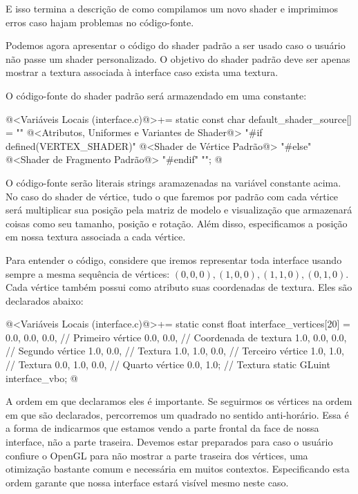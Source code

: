 E isso termina a descrição de como compilamos um novo shader e
imprimimos erros caso hajam problemas no código-fonte.

Podemos agora apresentar o código do shader padrão a ser usado caso o
usuário não passe um shader personalizado. O objetivo do shader padrão
deve ser apenas mostrar a textura associada à interface caso exista
uma textura.

O código-fonte do shader padrão será armazendado em uma constante:

\iniciocodigo
@<Variáveis Locais (interface.c)@>+=
static const char default_shader_source[] = ""
@<Atributos, Uniformes e Variantes de Shader@>
"#if defined(VERTEX_SHADER)\n"
@<Shader de Vértice Padrão@>
"#else\n"
@<Shader de Fragmento Padrão@>
"#endif\n"
                                           "";
@
\fimcodigo

O código-fonte serão literais strings aramazenadas na variável
constante acima. No caso do shader de vértice, tudo o que faremos por
padrão com cada vértice será multiplicar sua posição pela matriz de
modelo e visualização que armazenará coisas como seu tamanho, posição
e rotação. Além disso, especificamos a posição em nossa textura
associada a cada vértice.

Para entender o código, considere que iremos representar toda
interface usando sempre a mesma sequência de vértices: $(0, 0, 0), (1,
0, 0), (1, 1, 0), (0, 1, 0)$. Cada vértice também possui como atributo
suas coordenadas de textura. Eles são declarados abaixo:

\iniciocodigo
@<Variáveis Locais (interface.c)@>+=
static const float interface_vertices[20] = {
  0.0, 0.0, 0.0, // Primeiro vértice
  0.0, 0.0,     // Coordenada de textura
  1.0, 0.0, 0.0, // Segundo vértice
  1.0, 0.0,     // Textura
  1.0, 1.0, 0.0,  // Terceiro vértice
  1.0, 1.0,      // Textura
  0.0, 1.0, 0.0, // Quarto vértice
  0.0, 1.0};    // Textura
static GLuint interface_vbo;
@
\fimcodigo

A ordem em que declaramos eles é importante. Se seguirmos os vértices
na ordem em que são declarados, percorremos um quadrado no sentido
anti-horário. Essa é a forma de indicarmos que estamos vendo a parte
frontal da face de nossa interface, não a parte traseira. Devemos
estar preparados para caso o usuário confiure o OpenGL para não
mostrar a parte traseira dos vértices, uma otimização bastante comum e
necessária em muitos contextos. Especificando esta ordem garante que
nossa interface estará visível mesmo neste caso.


